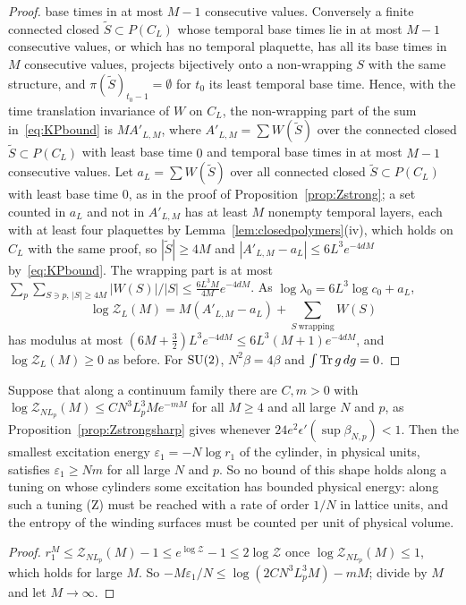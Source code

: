 \begin{proof}
base times in at most $M-1$ consecutive values. Conversely a finite
connected closed $\tilde S\subset P(C_L)$ whose temporal base times lie in
at most $M-1$ consecutive values, or which has no temporal plaquette, has
all its base times in $M$ consecutive values, projects bijectively onto a
non-wrapping $S$ with the same structure, and $\pi(\tilde S)_{t_0-1}=
\emptyset$ for $t_0$ its least temporal base time. Hence, with the time
translation invariance of $W$ on $C_L$, the non-wrapping part of the sum
in~\eqref{eq:KPbound} is $M A'_{L,M}$, where $A'_{L,M}=\sum W(\tilde S)$ over
the connected closed $\tilde S\subset P(C_L)$ with least base time $0$ and
temporal base times in at most $M-1$ consecutive values. Let $a_L=\sum
W(\tilde S)$ over all connected closed $\tilde S\subset P(C_L)$ with least
base time $0$, as in the proof of Proposition~\ref{prop:Zstrong}; a set
counted in $a_L$ and not in $A'_{L,M}$ has at least $M$ nonempty temporal
layers, each with at least four plaquettes by
Lemma~\ref{lem:closedpolymers}(iv), which holds on $C_L$ with the same
proof, so $|\tilde S|\ge4M$ and $|A'_{L,M}-a_L|\le6L^3e^{-4dM}$
by~\eqref{eq:KPbound}. The wrapping part is at most $\sum_p\sum_{S\ni p,\,
|S|\ge4M}|W(S)|/|S|\le\frac{6L^3M}{4M}e^{-4dM}$. As $\log\lambda_0=6L^3\log
c_0+a_L$,
\[
\log\mathcal Z_L(M)=M(A'_{L,M}-a_L)+\sum_{S\ \mathrm{wrapping}}W(S)
\]
has modulus at most $(6M+\tfrac32)L^3e^{-4dM}\le6L^3(M+1)e^{-4dM}$, and
$\log\mathcal Z_L(M)\ge0$ as before. For $\mathrm{SU}(2)$, $N^2\beta=4\beta$ and
$\int\operatorname{Tr} g\,dg=0$.
\end{proof}

\begin{proposition}\label{prop:nofixedrate}
Suppose that along a continuum family there are $C,m>0$ with
$\log\mathcal Z_{NL_p}(M)\le CN^3L_p^3Me^{-mM}$ for all $M\ge4$ and all
large $N$ and $p$, as Proposition~\ref{prop:Zstrongsharp} gives whenever
$24e^2\epsilon'(\sup\beta_{N,p})<1$. Then the smallest excitation energy
$\varepsilon_1=-N\log r_1$ of the cylinder, in physical units, satisfies
$\varepsilon_1\ge Nm$ for all large $N$ and $p$. So no bound of this shape
holds along a tuning on whose cylinders some excitation has bounded
physical energy: along such a tuning (Z) must be reached with a rate of
order $1/N$ in lattice units, and the entropy of the winding surfaces must
be counted per unit of physical volume.
\end{proposition}

\begin{proof}
$r_1^M\le\mathcal Z_{NL_p}(M)-1\le e^{\log\mathcal Z}-1\le2\log\mathcal Z$
once $\log\mathcal Z_{NL_p}(M)\le1$, which holds for large $M$. So
$-M\varepsilon_1/N\le\log(2CN^3L_p^3M)-mM$; divide by $M$ and let $M\to
\infty$.
\end{proof}

